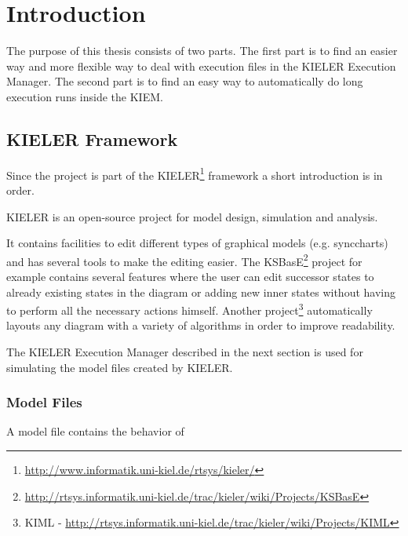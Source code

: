 

\chapter{Introduction}
\label{chapter:introduction}
The purpose of this thesis consists of two parts. The first part is to find an easier way and
more flexible way to deal with execution files in the \ac{KIELER} Execution Manager. The second part
is to find an easy way to automatically do long execution runs inside the \ac{KIEM}.

\section{KIELER Framework}
\label{sec:introKieler}
Since the project is part of the \ac{KIELER}\footnote{\url{http://www.informatik.uni-kiel.de/rtsys/kieler/}}
framework a short introduction is in order.

\ac{KIELER} is an open-source project for model design, simulation and analysis. 

It contains facilities to edit different types of graphical models (e.g. synccharts) and has several
tools to make the editing easier. The \ac{KSBasE}\footnote{\url{http://rtsys.informatik.uni-kiel.de/trac/kieler/wiki/Projects/KSBasE}} 
project for example contains several features where the user can edit successor states to already existing states in the diagram or
adding new inner states without having to perform all the necessary actions himself. Another 
project\footnote{\ac{KIML} - \url{http://rtsys.informatik.uni-kiel.de/trac/kieler/wiki/Projects/KIML}}
automatically layouts any diagram with a variety of algorithms in order to improve readability.

The \ac{KIELER} Execution Manager described in the next section is used for simulating the
model files created by \ac{KIELER}.

\subsection{Model Files}
\label{section:IntroModelFile}
A model file contains the behavior of 

